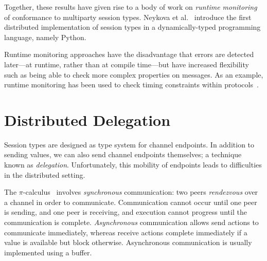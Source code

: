 \documentclass[
graybox,
envcountchap
]{svmult}
\begin{document}
\begin{bibunit}
  Together, these results have given rise to a body of work on \emph{runtime
  monitoring} of conformance to multiparty session types. Neykova et
  al.~\cite{NeykovaYH13:spy} introduce the first distributed implementation of
  session types in a dynamically-typed programming language, namely Python.

  Runtime monitoring approaches have the disadvantage that errors are detected
  later---at runtime, rather than at compile time---but have increased
  flexibility such as being able to check more complex properties on messages.
  As an example, runtime monitoring has been used to check timing
  constraints within protocols~\cite{NeykovaBY17:timed-monitoring}.


  \section{Distributed Delegation}\label{sec:bt:distrib-deleg}
  Session types are designed as type system for channel endpoints.
  In addition to sending values, we can also send channel endpoints themselves;
  a technique known as \emph{delegation}. Unfortunately, this mobility of
  endpoints leads to difficulties in the distributed setting.

  The $\pi$-calculus~\cite{Milner99:pi-calc} involves \emph{synchronous}
  communication: two peers \emph{rendezvous} over a channel in order to
  communicate. Communication cannot occur until one peer is sending, and one
  peer is receiving, and execution cannot progress until the communication is
  complete. \emph{Asynchronous} communication allows send actions to communicate
  immediately, whereas receive actions complete immediately if a value is
  available but block otherwise.  Asynchronous communication is usually
  implemented using a buffer.



\end{bibunit}
\end{document}
